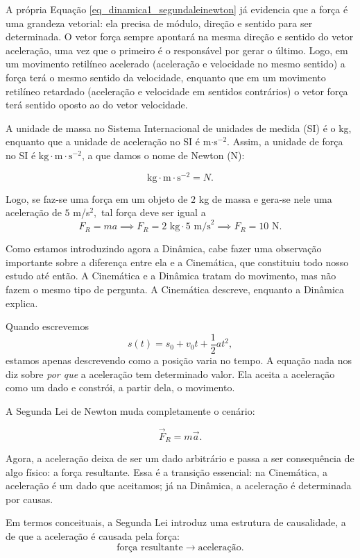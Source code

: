 

A própria Equação \eqref{eq_dinamica1_segundaleinewton} já evidencia que a força é uma grandeza vetorial: ela precisa de módulo, direção e sentido para ser determinada. O vetor força sempre apontará na mesma direção e sentido do vetor aceleração, uma vez que o primeiro é o responsável por gerar o último. Logo, em um movimento retilíneo acelerado (aceleração e velocidade no mesmo sentido) a força terá o mesmo sentido da velocidade, enquanto que em um movimento retilíneo retardado (aceleração e velocidade em sentidos contrários) o vetor força terá sentido oposto ao do vetor velocidade.

A unidade de massa no Sistema Internacional de unidades de medida (SI) é o kg, enquanto que a unidade de aceleração no SI é m$\cdot$s$^{-2}.$ Assim, a unidade de força no SI é $\text{kg}\cdot\text{m}\cdot\text{s}^{-2}$, a que damos o nome de Newton (N):

$$ \boxed{\text{kg}\cdot\text{m}\cdot\text{s}^{-2} = N.}$$

Logo, se faz-se uma força em um objeto de $2$ kg de massa e gera-se nele uma aceleração de $5$ m/s$^2,$ tal força deve ser igual a
$$ F_R = ma \implies F_R = 2 \text{ kg} \cdot 5 \text{ m/s}^2 \implies F_R = 10 \text{ N.}$$

Como estamos introduzindo agora a Dinâmica, cabe fazer uma observação importante sobre a diferença entre ela e a Cinemática, que constituiu todo nosso estudo até então.  A Cinemática e a Dinâmica tratam do movimento, mas não fazem o mesmo tipo de pergunta. A Cinemática descreve, enquanto a Dinâmica explica.

Quando escrevemos
\[
s(t)=s_0+v_0 t+\frac12 at^2,
\]
estamos apenas descrevendo como a posição varia no tempo. A equação nada nos diz sobre \emph{por que} a aceleração tem determinado valor. Ela aceita a aceleração como um dado e constrói, a partir dela, o movimento.

A Segunda Lei de Newton muda completamente o cenário:

$$ \vec F_R = m\vec a.$$
 

Agora, a aceleração deixa de ser um dado arbitrário e passa a ser consequência de algo físico: a força resultante. Essa é a transição essencial: na Cinemática, a aceleração é um dado que aceitamos; já na Dinâmica, a aceleração é determinada por causas.


Em termos conceituais, a Segunda Lei introduz uma estrutura de causalidade, a de que a aceleração é causada pela força:
\[
\text{força resultante} \longrightarrow \text{aceleração}.
\]

